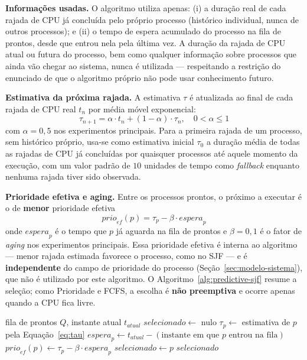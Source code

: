 \documentclass[conference]{IEEEtran}
\begin{document}
\textbf{Informações usadas.} O algoritmo utiliza apenas: (i) a duração real de cada rajada de CPU já concluída pelo próprio processo (histórico individual, nunca de outros processos); e (ii) o tempo de espera acumulado do processo na fila de prontos, desde que entrou nela pela última vez. A duração da rajada de CPU atual ou futura do processo, bem como qualquer informação sobre processos que ainda vão chegar ao sistema, nunca é utilizada — respeitando a restrição do enunciado de que o algoritmo próprio não pode usar conhecimento futuro.

\textbf{Estimativa da próxima rajada.} A estimativa $\tau$ é atualizada ao final de cada rajada de CPU real $t_n$ por média móvel exponencial:
\begin{equation}
\tau_{n+1} = \alpha \cdot t_n + (1 - \alpha) \cdot \tau_n, \quad 0 < \alpha \le 1
\label{eq:tau}
\end{equation}
com $\alpha = 0{,}5$ nos experimentos principais. Para a primeira rajada de um processo, sem histórico próprio, usa-se como estimativa inicial $\tau_0$ a duração média de todas as rajadas de CPU já concluídas por quaisquer processos até aquele momento da execução, com um valor padrão de $10$ unidades de tempo como \textit{fallback} enquanto nenhuma rajada tiver sido observada.

\textbf{Prioridade efetiva e aging.} Entre os processos prontos, o próximo a executar é o de \textbf{menor} prioridade efetiva
\begin{equation}
\mathit{prio}_{ef}(p) = \tau_p - \beta \cdot \mathit{espera}_p
\label{eq:prio-efetiva}
\end{equation}
onde $\mathit{espera}_p$ é o tempo que $p$ já aguarda na fila de prontos e $\beta = 0{,}1$ é o fator de \textit{aging} nos experimentos principais. Essa prioridade efetiva é interna ao algoritmo — menor rajada estimada favorece o processo, como no SJF — e é \textbf{independente} do campo de prioridade do processo (Seção~\ref{sec:modelo-sistema}), que não é utilizado por este algoritmo. O Algoritmo~\ref{alg:predictive-sjf} resume a seleção; como Prioridade e FCFS, a escolha é \textbf{não preemptiva} e ocorre apenas quando a CPU fica livre.

\begin{algorithm}[t]
\caption{Seleção do próximo processo — SJF Preditivo com Aging}
\label{alg:predictive-sjf}
\begin{algorithmic}[1]
\REQUIRE fila de prontos $Q$, instante atual $t_{\mathit{atual}}$
\STATE $\mathit{selecionado} \gets$ nulo
    \STATE $\tau_p \gets$ estimativa de $p$ pela Equação~\eqref{eq:tau}
    \STATE $\mathit{espera}_p \gets t_{\mathit{atual}} - (\text{instante em que } p \text{ entrou na fila})$
    \STATE $\mathit{prio}_{ef}(p) \gets \tau_p - \beta \cdot \mathit{espera}_p$
        \STATE $\mathit{selecionado} \gets p$
    \ENDIF
\ENDFOR
\RETURN $\mathit{selecionado}$
\end{algorithmic}
\end{algorithm}
\end{document}
